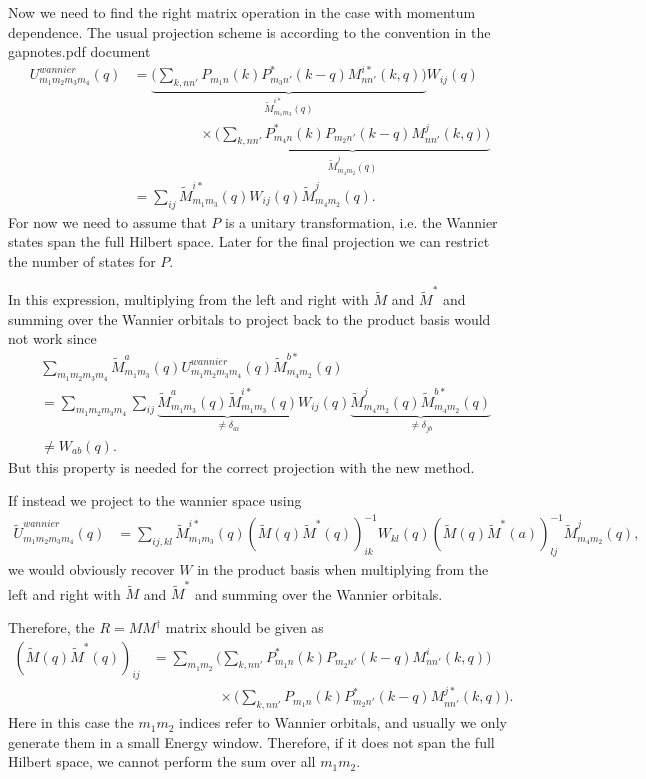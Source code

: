 \documentclass[12pt,a4paper]{scrartcl}
\numberwithin{equation}{section}
\begin{document}
\bigskip 

Now we need to find the right matrix operation in the case with momentum dependence.
The usual projection scheme is according to the convention in the gapnotes.pdf document
\begin{align}
 U^{wannier}_{m_1m_2m_3m_4}(q) &=  \underbrace{\Big( \sum_{k,nn'} P_{m_1n}(k) P_{m_3n'}^*(k-q) M^{i*}_{nn'}(k,q) \Big)}_{\tilde{M}^{i*}_{m_1m_3}(q)} 
 W_{ij}(q)  \nonumber \\
 & \hspace{2cm} \times  \underbrace{\Big( \sum_{k,nn'} P^*_{m_4n}(k) P_{m_2n'}(k-q) M^{j}_{nn'}(k,q) \Big)}_{\tilde{M}^{j}_{m_4m_2}(q)} \\
 &= \sum_{ij}\tilde{M}^{i*}_{m_1m_3}(q)  W_{ij}(q) \tilde{M}^{j}_{m_4m_2}(q) .
\end{align}
For now we need to assume that $P$ is a unitary transformation, i.e. the Wannier states span the full Hilbert space.
Later for the final projection we can restrict the number of states for $P$.

In this expression, multiplying from the left and right with $\tilde{M}$ and $\tilde{M}^*$ 
and summing over the Wannier orbitals to project back to the product basis would not work since
\begin{align}
 &\sum_{m_1m_2m_3m_4}  \tilde{M}^{a}_{m_1m_3}(q) U^{wannier}_{m_1m_2m_3m_4}(q) \tilde{M}^{b*}_{m_4m_2}(q) \\
 &= \sum_{m_1m_2m_3m_4} \sum_{ij} \underbrace{\tilde{M}^{a}_{m_1m_3}(q) \tilde{M}^{i*}_{m_1m_3}(q)}_{\neq \delta_{ai}}  W_{ij}(q) \underbrace{ \tilde{M}^{j}_{m_4m_2}(q) \tilde{M}^{b*}_{m_4m_2}(q) }_{\neq \delta_{jb}} \\
 &\neq  W_{ab}(q) .
\end{align}
But this property is needed for the correct projection with the new method. 

If instead we project to the wannier space using 
\begin{align}
 \tilde{U}^{wannier}_{m_1m_2m_3m_4}(q) 
 &= \sum_{ij,kl}\tilde{M}^{i*}_{m_1m_3}(q) \left(  \tilde{M}(q) \tilde{M}^{*}(q) \right)^{-1}_{ik} W_{kl}(q) \left(  \tilde{M}(q) \tilde{M}^{*}(a) \right)^{-1}_{lj} \tilde{M}^{j}_{m_4m_2}(q) ,
\end{align}
we would obviously recover $W$ in the product basis when multiplying from the left and right with $\tilde{M}$ and $\tilde{M}^*$ 
and summing over the Wannier orbitals.

Therefore,  the $R= M M^{\dagger}$ matrix should be given as
\begin{align}
 \left(  \tilde{M}(q) \tilde{M}^{*}(q) \right)_{ij}
 &= \sum_{m_1m_2}\Big( \sum_{k,nn'} P^*_{m_1n}(k) P_{m_2n'}(k-q) M^{i}_{nn'}(k,q) \Big) \nonumber \\
 &\hspace{2cm} \times    \Big( \sum_{k,nn'} P_{m_1n}(k) P_{m_2n'}^*(k-q) M^{j*}_{nn'}(k,q) \Big).
\end{align}
Here in this case the $m_1m_2$ indices refer to Wannier orbitals, and usually we only generate them in a small Energy window.
Therefore, if it does not span the full Hilbert space, we cannot perform the sum over all $m_1m_2$.
\end{document}
